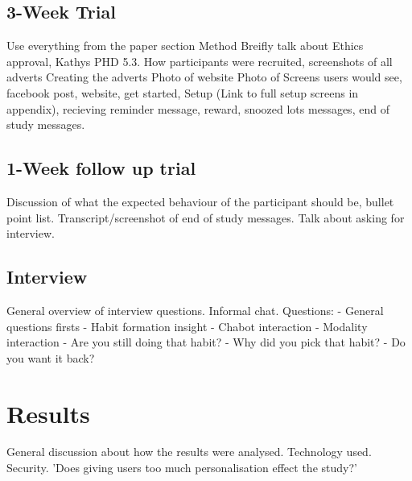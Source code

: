 \subsection{3-Week Trial}

Use everything from the paper section Method\newline
\newline
Breifly talk about Ethics approval, Kathys PHD 5.3.\newline
How participants were recruited, screenshots of all adverts\newline
Creating the adverts\newline
Photo of website\newline
Photo of Screens users would see, facebook post, website, get started, Setup (Link to full setup screens in appendix), recieving reminder message, reward, snoozed lots messages, end of study messages.\newline


\subsection{1-Week follow up trial}

Discussion of what the expected behaviour of the participant should be, bullet point list.\newline
Transcript/screenshot of end of study messages.\newline
Talk about asking for interview.

\subsection{Interview}

General overview of interview questions.\newline
Informal chat.\newline
Questions:
  - General questions firsts
  - Habit formation insight
  - Chabot interaction
  - Modality interaction
  - Are you still doing that habit?
  - Why did you pick that habit?
  - Do you want it back?


\section{Results}

General discussion about how the results were analysed. Technology used. Security.\newline
'Does giving users too much personalisation effect the study?'\newline


